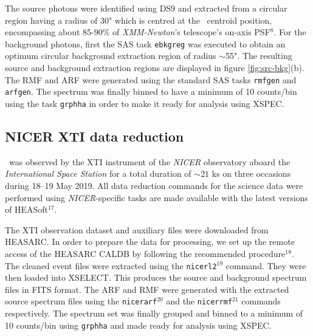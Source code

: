     	The source photons were identified using DS9 and extracted from a circular region having a radius of 30" which is centred at the \source\ centroid position, encompassing about 85-90\% of \textit{XMM-Newton}'s telescope's on-axis PSF$^8$. For the background photons, first the SAS task \texttt{ebkgreg} was executed to obtain an optimum circular background extraction region of radius $\sim$55". The resulting source and background extraction regions are displayed in figure \ref{fig:src-bkg}(b). The RMF and ARF were generated using the standard SAS tasks \texttt{rmfgen} and \texttt{arfgen}. The spectrum was finally binned to have a minimum of 10 counts/bin using the task \texttt{grphha} in order to make it ready for analysis using XSPEC.
    
    \subsection{NICER XTI data reduction}
    	\source\ was observed by the XTI instrument of the \textit{NICER} observatory aboard the \textit{International Space Station} for a total duration of $\sim 21$ ks on three occasions during 18--19 May 2019. All data reduction commands for the science data were performed using \textit{NICER}-specific tasks are made available with the latest versions of HEASoft$^{17}$.
    	
    	The XTI observation dataset and auxiliary files were downloaded from HEASARC. In order to prepare the data for processing, we set up the remote access of the HEASARC CALDB by following the recommended procedure$^{18}$. The cleaned event files were extracted using the \texttt{nicerl2}$^{19}$ command. They were then loaded into XSELECT. This produces the source and background spectrum files in FITS format. The ARF and RMF were generated with the extracted source spectrum files using the \texttt{nicerarf}$^{20}$ and the \texttt{nicerrmf}$^{21}$ commands respectively. The spectrum set was finally grouped and binned to a minimum of 10 counts/bin using \texttt{grphha} and made ready for analysis using XSPEC.